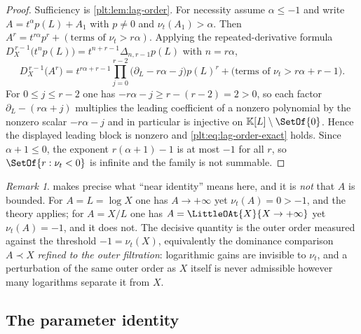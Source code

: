 \documentclass[11pt,oneside]{article}
\theoremstyle{plain}
\theoremstyle{definition}
\theoremstyle{remark}
\newtheorem{remark}[theorem]{Remark}
\newcommand{\K}{\mathbb{K}}
\newcommand{\ordt}{\nu_{t}}                              %
\newcommand{\DX}{D_{X}}                                  %
\newcommand{\shiftop}[2]{\Delta_{#1,#2}}                 %
\newcommand{\precdom}{\prec}
\begin{document}
\begin{proof}
Sufficiency is \cref{plt:lem:lag-order}.  For necessity assume
\(\alpha\le-1\) and write \(A=t^{\alpha}p(L)+A_1\) with \(p\ne0\) and
\(\ordt(A_1)>\alpha\).  Then
\(A^r=t^{r\alpha}p^r+(\text{terms of }\ordt>r\alpha)\).  Applying the
repeated-derivative formula
\(\DX^{\,r-1}\bigl(t^{n}p(L)\bigr)=t^{n+r-1}\shiftop{n}{r-1}p(L)\) with
\(n=r\alpha\),
\[
  \DX^{\,r-1}\bigl(A^r\bigr)
  =t^{r\alpha+r-1}\prod_{j=0}^{r-2}\bigl(\partial_L-r\alpha-j\bigr)p(L)^r
   +\bigl(\text{terms of }\ordt>r\alpha+r-1\bigr).
\]
For \(0\le j\le r-2\) one has \(-r\alpha-j\ge r-(r-2)=2>0\), so each factor
\(\partial_L-(r\alpha+j)\) multiplies the leading coefficient of a nonzero
polynomial by the nonzero scalar \(-r\alpha-j\) and in particular is injective
on \(\K[L]\setminus\SetOf{0}\).  Hence the displayed leading block is nonzero
and \cref{plt:eq:lag-order-exact} holds.  Since \(\alpha+1\le0\), the exponent
\(r(\alpha+1)-1\) is at most \(-1\) for all \(r\), so
\(\SetOf{r:\ordt<0}\) is infinite and the family is not summable.
\end{proof}

\begin{remark}
\label{plt:rmk:lag-nearid-meaning}
 makes precise what ``near identity''
means here, and it is \emph{not} that \(A\) is bounded.  For
\(A=L=\log X\) one has \(A\to+\infty\) yet \(\ordt(A)=0>-1\), and the theory
applies; for \(A=X/L\) one has \(A=\LittleOAt{X}{X\to+\infty}\) yet
\(\ordt(A)=-1\), and it does not.  The decisive quantity is the outer order
measured against the threshold \(-1=\ordt(X)\), equivalently the dominance
comparison \(A\precdom X\) \emph{refined to the outer filtration}: logarithmic
gains are invisible to \(\ordt\), and a perturbation of the same outer order as
\(X\) itself is never admissible however many logarithms separate it from
\(X\).
\end{remark}

\subsection{The parameter identity}
\label{plt:sec:lag-parameter}
\end{document}
